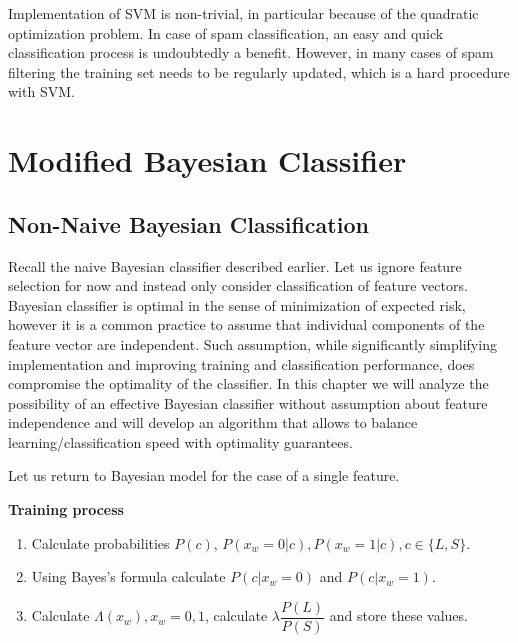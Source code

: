 \documentclass[12pt]{report}
\makeatletter
\renewcommand{\subsection}{\@startsection{subsection}{2}{0mm}{-\baselineskip}{-5pt}{\bf}}
\makeatother
\begin{document}
Implementation of SVM is non-trivial, in particular because of the quadratic optimization problem. In case of spam classification, an easy and quick classification process is undoubtedly a benefit. However, in many cases of spam filtering the training set needs to be regularly updated, which is a hard procedure with SVM.

\newpage


\chapter{Modified Bayesian Classifier}

\section{Non-Naive Bayesian Classification}

\subsection{Overview}

Recall the naive Bayesian classifier described earlier. Let us ignore feature selection for now and instead only consider classification of feature vectors. Bayesian classifier is optimal in the sense of minimization of expected risk, however it is a common practice to assume that individual components of the feature vector are independent. Such assumption, while significantly simplifying implementation and improving training and classification performance, does compromise the optimality of the classifier. In this chapter we will analyze the possibility of an effective Bayesian classifier without assumption about feature independence and will develop an algorithm that allows to balance learning/classification speed with optimality guarantees.

Let us return to Bayesian model for the case of a single feature.

\textbf{Training process}

\begin{enumerate}
	\item Calculate probabilities $P(c)$, $P(x_w = 0 | c), P(x_w = 1 | c), c \in \{L, S\}$.
	\item Using Bayes's formula calculate $P(c | x_w = 0)$ and $P(c | x_w = 1)$.
	\item Calculate $\Lambda(x_w), x_w = 0, 1$, calculate $\lambda \dfrac{P(L)}{P(S)}$ and store these values.
\end{enumerate}
\end{document}

